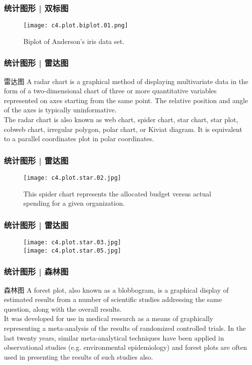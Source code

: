 \begin{frame}
  \frametitle{统计图形 | 双标图}
  \begin{figure}
    \centering
    \texttt{[image: c4.plot.biplot.01.png]}
    \caption{Biplot of Anderson's iris data set.}
  \end{figure}
\end{frame}

\begin{frame}
  \frametitle{统计图形 | 雷达图}
  \begin{block}{雷达图}
    A radar chart is a graphical method of displaying multivariate data in the form of a two-dimensional chart of three or more quantitative variables represented on axes starting from the same point. The relative position and angle of the axes is typically uninformative.\\
    \vspace{0.5em}
The radar chart is also known as web chart, spider chart, star chart, star plot, cobweb chart, irregular polygon, polar chart, or Kiviat diagram. It is equivalent to a parallel coordinates plot in polar coordinates.
  \end{block}
\end{frame}

\begin{frame}
  \frametitle{统计图形 | 雷达图}
  \begin{figure}
    \centering
    \texttt{[image: c4.plot.star.02.jpg]}
    \caption{This spider chart represents the allocated budget versus actual spending for a given organization.}
  \end{figure}
\end{frame}

\begin{frame}
  \frametitle{统计图形 | 雷达图}
  \begin{figure}
    \centering
    \texttt{[image: c4.plot.star.03.jpg]}\\
    \texttt{[image: c4.plot.star.05.jpg]}
  \end{figure}
\end{frame}

\begin{frame}
  \frametitle{统计图形 | 森林图}
  \begin{block}{森林图}
    A forest plot, also known as a blobbogram, is a graphical display of estimated results from a number of scientific studies addressing the same question, along with the overall results.\\
    \vspace{0.5em}
It was developed for use in medical research as a means of graphically representing a meta-analysis of the results of randomized controlled trials. In the last twenty years, similar meta-analytical techniques have been applied in observational studies (e.g. environmental epidemiology) and forest plots are often used in presenting the results of such studies also.
  \end{block}
\end{frame}

